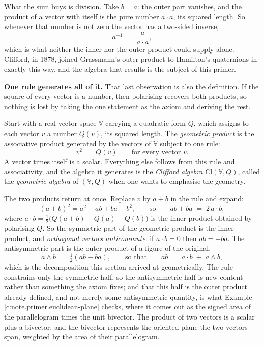 \documentclass[11pt]{article}
\theoremstyle{definition}
\theoremstyle{plain}
\providecommand{\Cl}{}\renewcommand{\Cl}{\mathrm{Cl}}
\begin{document}
What the sum buys is division. Take $b = a$: the outer part vanishes, and the product of a vector with itself is the pure number $a \cdot a$, its squared length. So whenever that number is not zero the vector has a two-sided inverse,
\[
a^{-1} \;=\; \frac{a}{a \cdot a} ,
\]
which is what neither the inner nor the outer product could supply alone. Clifford, in 1878, joined Grassmann's outer product to Hamilton's quaternions in exactly this way, and the algebra that results is the subject of this primer.

\label{c:note.primer.setting-products-vectors-one-rule-5}
\textbf{One rule generates all of it.} That last observation is also the definition. If the square of every vector is a number, then polarising recovers both products, so nothing is lost by taking the one statement as the axiom and deriving the rest.

Start with a real vector space $\mathbb{V}$ carrying a quadratic form $Q$, which assigns to each vector $v$ a number $Q(v)$, its squared length. The \emph{geometric product} is the associative product generated by the vectors of $\mathbb{V}$ subject to one rule:
\[
v^{2} \;=\; Q(v) \qquad \text{for every vector } v .
\]
A vector times itself is a scalar. Everything else follows from this rule and associativity, and the algebra it generates is the \emph{Clifford algebra} $\Cl(\mathbb{V}, Q)$, called the \emph{geometric algebra} of $(\mathbb{V}, Q)$ when one wants to emphasise the geometry.

The two products return at once. Replace $v$ by $a + b$ in the rule and expand:
\[
(a+b)^{2} = a^{2} + ab + ba + b^{2}, \qquad \text{so} \qquad ab + ba \;=\; 2\, a \cdot b ,
\]
where $a \cdot b = \tfrac12\bigl(Q(a+b) - Q(a) - Q(b)\bigr)$ is the inner product obtained by polarising $Q$. So the symmetric part of the geometric product is the inner product, and \emph{orthogonal vectors anticommute}: if $a \cdot b = 0$ then $ab = -ba$. The antisymmetric part is the outer product of a figure of the original,
\[
a \wedge b \;=\; \tfrac12 (ab - ba), \qquad \text{so that} \qquad ab \;=\; a \cdot b \;+\; a \wedge b ,
\]
which is the decomposition this section arrived at geometrically. The rule constrains only the symmetric half, so the antisymmetric half is new content rather than something the axiom fixes; and that this half is the outer product already defined, and not merely some antisymmetric quantity, is what Example \ref{c:note.primer.euclidean-plane} checks, where it comes out as the signed area of the parallelogram times the unit bivector. The product of two vectors is a scalar plus a bivector, and the bivector represents the oriented plane the two vectors span, weighted by the area of their parallelogram.
\end{document}
